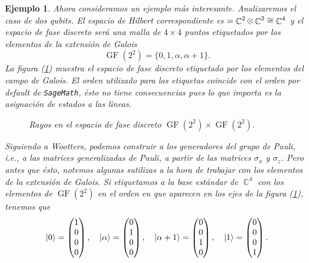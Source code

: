 \documentclass[a4paper]{report}
\DeclareMathOperator{\C}{\mathbb{C}}
\let\H\relax
\DeclareMathOperator{\H}{\mathcal H}
\DeclareMathOperator{\GF}{GF}
\newtheorem{example}{Ejemplo}
\begin{document}
  \begin{example}
    Ahora consideramos un ejemplo más interesante.
    Analizaremos el caso de dos qubits. El espacio de
    Hilbert correspondiente es $\H = \C^2 \otimes \C^2 \cong
    \C^{4}$ y el espacio de fase discreto será una malla de
    $4 \times 4$ puntos etiquetados por los elementos de la
    extensión de Galois
    \[
      \GF(2^2)
      = \{0,1,\alpha,\alpha+1\}.
    \] 
    La figura (\ref{fig:wootters-affine-2-qubits}) muestra
    el espacio de fase discreto etiquetado por los elementos
    del campo de Galois. El orden utilizado para las
    etiquetas coincide con el orden por default de
    \texttt{SageMath}, ésto no tiene consecuencias pues lo
    que importa es la asignación de estados a las lineas.
    \begin{figure}[ht]
      \centering
      \scalebox{0.7}{
        
      }
      \caption{Rayos en el espacio de fase discreto
      $\GF(2^2) \times \GF(2^2)$.}
      \label{fig:wootters-affine-2-qubits}
    \end{figure}
    Siguiendo a Wootters, podemos construir a los
    generadores del grupo de Pauli, i.e., a las matrices
    generalizadas de Pauli, a partir de las matrices
    $\sigma_x$ y $\sigma_z$. Pero antes que ésto, notemos
    algunas sutilizas a la hora de trabajar con los
    elementos de la extensión de Galois. Si etiquetamos a la
    base estándar de $\C^{4}$ con los elementos de
    $\GF(2^2)$ en el orden en que aparecen en los ejes de la
    figura (\ref{fig:wootters-affine-2-qubits}), tenemos que
    \[
      \ket 0
      = \begin{pmatrix} 1\\0\\0\\0 \end{pmatrix},
      \quad
      \ket{\alpha}
      = \begin{pmatrix} 0\\1\\0\\0 \end{pmatrix},
      \quad
      \ket{\alpha + 1}
      = \begin{pmatrix} 0\\0\\1\\0 \end{pmatrix},
      \quad
      \ket{1}
      = \begin{pmatrix} 0\\0\\0\\1 \end{pmatrix}. 
\]
\end{example}
\end{document}
